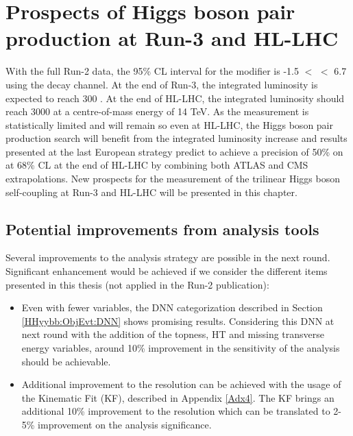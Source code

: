 \newpage
\chapter{Prospects of Higgs boson pair production at Run-3 and HL-LHC}
\label{HL-LHC}

With the full Run-2 data, the 95\% CL interval for the \kl modifier is -1.5 $<$ \kl $<$ 6.7 using the \HHyybb decay channel. At the end of Run-3, the integrated luminosity is expected to reach 300 \ifb. At the end of HL-LHC, the integrated luminosity should reach 3000 \ifb at a centre-of-mass energy of 14 TeV. As the measurement is statistically limited and will remain so even at HL-LHC, the Higgs boson pair production search will benefit from the integrated luminosity increase and results presented at the last European strategy predict to achieve a precision of 50\% on \kl at 68\% CL at the end of HL-LHC \cite{Europ} by combining both ATLAS and CMS extrapolations. New prospects for the measurement of the trilinear Higgs boson self-coupling at Run-3 and HL-LHC will be presented in this chapter. 

\section{Potential \HHyybb improvements from analysis tools}
\label{HL-LHC:Run-3}

Several improvements to the \HHyybb analysis strategy are possible in the next round. Significant enhancement would be achieved if we consider the different items presented in this thesis (not applied in the Run-2 publication):
\begin{itemize}
    \item Even with fewer variables, the DNN categorization described in Section \ref{HHyybb:ObjEvt:DNN} shows promising results. Considering this DNN at next round with the addition of the topness, HT and missing transverse energy variables, around 10\% improvement in the sensitivity of the analysis should be achievable. 
    \item Additional improvement to the \mbb resolution can be achieved with the usage of the Kinematic Fit (KF), described in Appendix \ref{Adx4}. The KF brings an additional 10\% improvement to the \mbb resolution which can be translated to 2-5\% improvement on the analysis significance. 
\end{itemize}

